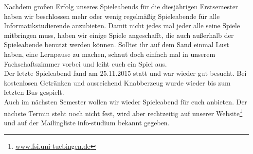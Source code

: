 Nachdem großen Erfolg unseres Spieleabends für die diesjährigen Erstsemester haben wir beschlossen mehr oder wenig regelmäßig Spieleabende für alle Informatikstudierende anzubieten. Damit nicht jedes mal jeder alle seine Spiele mitbringen muss, haben wir einige Spiele angeschafft, die auch außerhalb der Spieleabende benutzt werden können. Solltet ihr auf dem Sand einmal Lust haben, eine Lernpause zu machen, schaut doch einfach mal in unserem Fachschaftszimmer vorbei und leiht euch ein Spiel aus.\\
Der letzte Spieleabend fand am 25.11.2015 statt und war wieder gut besucht. Bei kostenlosen Getränken und ausreichend Knabberzeug wurde wieder bis zum letzten Bus gespielt.\\
Auch im nächsten Semester wollen wir wieder Spieleabend für euch anbieten. Der nächste Termin steht noch nicht fest, wird aber rechtzeitig auf unserer Website\footnote{\url{www.fsi.uni-tuebingen.de}} und auf der Mailingliste info-studium bekannt gegeben.